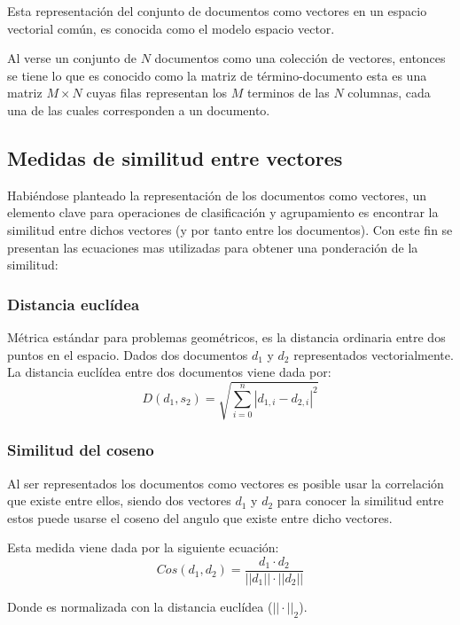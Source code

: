   Esta representación del conjunto de documentos como vectores en un espacio vectorial común, es conocida como el modelo espacio vector.\cite{informationretrieval}

  Al verse un conjunto de $N$ documentos como una colección de vectores, entonces se tiene lo que es conocido como la matriz de término-documento esta es una matriz $M\times N$ cuyas filas representan los $M$ terminos de las $N$ columnas, cada una de las cuales corresponden a un documento.\cite{informationretrieval}

\subsection{Medidas de similitud entre vectores}
  Habiéndose planteado la representación de los documentos como vectores, un elemento clave para operaciones de clasificación y agrupamiento es encontrar la similitud entre dichos vectores (y por tanto entre los documentos). Con este fin se presentan las ecuaciones mas utilizadas para obtener una ponderación de la similitud:
  \subsubsection{Distancia euclídea}
    Métrica estándar para problemas geométricos, es la distancia ordinaria entre dos puntos en el espacio.
    Dados dos documentos $d_1$ y $d_2$ representados vectorialmente. La distancia euclídea entre dos documentos viene dada por:  
    \begin{equation} \label{eq:deuc} 
D(d_1,s_2)=\sqrt{\sum\limits_{i=0}^n {|d_{1,i}-d_{2,i}|}^2 }
\end{equation}

  \subsubsection{Similitud del coseno}
    Al ser representados los documentos como vectores es posible usar la correlación que existe entre ellos, siendo dos vectores $d_1$ y $d_2$ para conocer la similitud entre estos puede usarse el coseno del angulo que existe entre dicho vectores.

    Esta medida viene dada por la siguiente ecuación: 
    \begin{equation} \label{eq:cos} 
Cos(d_1,d_2)=\frac{d_1\cdot d_2}{||d_1||\cdot ||d_2||}
\end{equation}

    Donde es normalizada con la distancia euclídea ($||\cdot||_2$).

